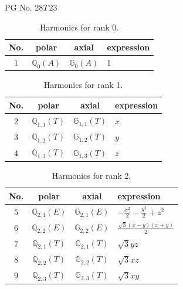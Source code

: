 \documentclass[fleqn,8pt,landscape]{jsarticle}
\begin{document}
\setcounter{MaxMatrixCols}{32}

\renewcommand{\tablename}{Table~}
\renewcommand{\figurename}{Figure~}
\begin{center}
\LARGE
PG No. 28\quad$T_{\rm }$\quad$23$\quad[ cubic ]
\end{center}
\begin{table}[ht!]
\begin{center}
\caption{Harmonics for rank 0.}
\renewcommand{\arraystretch}{1.3}
\begin{tabular}{cccl} \hline \hline
No. & polar & axial & expression \\ \hline
$ 1 $ & $ \mathbb{Q}_{0}(A) $ & $ \mathbb{G}_{0}(A) $ & $ 1 $ \\
 \hline \hline
\end{tabular}
\end{center}
\end{table}
\begin{table}[ht!]
\begin{center}
\caption{Harmonics for rank 1.}
\renewcommand{\arraystretch}{1.3}
\begin{tabular}{cccl} \hline \hline
No. & polar & axial & expression \\ \hline
$ 2 $ & $ \mathbb{Q}_{1,1}(T) $ & $ \mathbb{G}_{1,1}(T) $ & $ x $ \\
$ 3 $ & $ \mathbb{Q}_{1,2}(T) $ & $ \mathbb{G}_{1,2}(T) $ & $ y $ \\
$ 4 $ & $ \mathbb{Q}_{1,3}(T) $ & $ \mathbb{G}_{1,3}(T) $ & $ z $ \\
 \hline \hline
\end{tabular}
\end{center}
\end{table}
\begin{table}[ht!]
\begin{center}
\caption{Harmonics for rank 2.}
\renewcommand{\arraystretch}{1.3}
\begin{tabular}{cccl} \hline \hline
No. & polar & axial & expression \\ \hline
$ 5 $ & $ \mathbb{Q}_{2,1}(E) $ & $ \mathbb{G}_{2,1}(E) $ & $ - \frac{x^{2}}{2} - \frac{y^{2}}{2} + z^{2} $ \\
$ 6 $ & $ \mathbb{Q}_{2,2}(E) $ & $ \mathbb{G}_{2,2}(E) $ & $ \frac{\sqrt{3} \left(x - y\right) \left(x + y\right)}{2} $ \\
$ 7 $ & $ \mathbb{Q}_{2,1}(T) $ & $ \mathbb{G}_{2,1}(T) $ & $ \sqrt{3} y z $ \\
$ 8 $ & $ \mathbb{Q}_{2,2}(T) $ & $ \mathbb{G}_{2,2}(T) $ & $ \sqrt{3} x z $ \\
$ 9 $ & $ \mathbb{Q}_{2,3}(T) $ & $ \mathbb{G}_{2,3}(T) $ & $ \sqrt{3} x y $ \\
 \hline \hline
\end{tabular}
\end{center}
\end{table}
\end{document}
